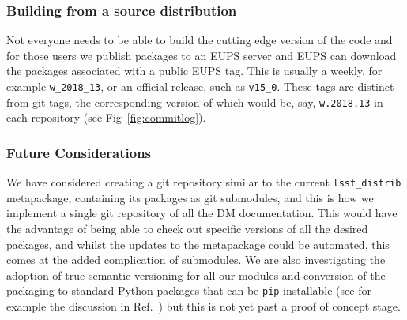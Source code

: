 \subsubsection{Building from a source distribution}

Not everyone needs to be able to build the cutting edge version of the code and for those users we publish packages to an EUPS server and EUPS can download the packages associated with a public EUPS tag.
This is usually a weekly, for example \texttt{w\_2018\_13}, or an official release, such as \texttt{v15\_0}.
These tags are distinct from git tags, the corresponding version of which would be, say, \texttt{w.2018.13} in each repository (see Fig~\ref{fig:commitlog}).

\subsubsection{Future Considerations}

We have considered creating a git repository similar to the current \texttt{lsst\_distrib} metapackage, containing its packages as git submodules, and this is how we implement a single git repository of all the DM documentation.
This would have the advantage of being able to check out specific versions of all the desired packages, and whilst the updates to the metapackage could be automated, this comes at the added complication of submodules.
We are also investigating the adoption of true semantic versioning\cite{semver} for all our modules and conversion of the packaging to standard Python packages that can be \texttt{pip}-installable (see for example the discussion in Ref.~) but this is not yet past a proof of concept stage.
